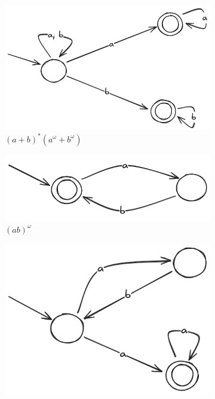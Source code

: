 \documentclass{article}
\begin{document}
\begin{figure}[!htb]
\begin{subfigure}[b]{0.3\textwidth}
		\includegraphics[width=\textwidth]{04-10-04.png}
		\caption{$(a + b)^*(a^\omega + b^\omega)$}
	\end{subfigure}
	\hfil
	\begin{subfigure}[b]{0.3\textwidth}
		\centering
		\includegraphics[width=\textwidth]{04-10-05.png}
		\caption{$(ab)^\omega$}
	\end{subfigure}
	\hfil
	\begin{subfigure}[b]{0.2\textwidth}
		\centering
		\includegraphics[width=\textwidth]{04-10-06.png}

\end{subfigure}
\end{figure}
\end{document}
